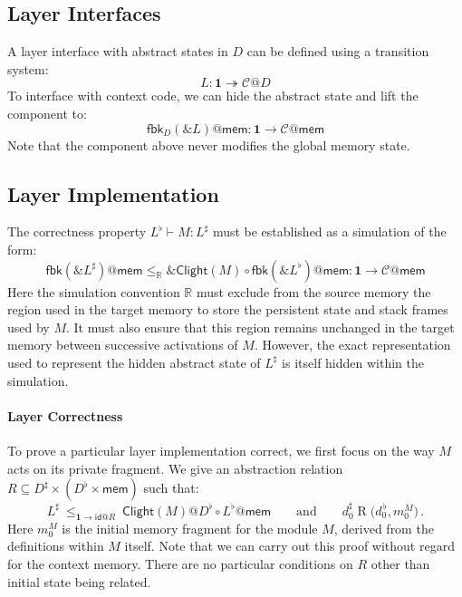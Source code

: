 \documentclass[acmsmall,screen,review,anonymous]{acmart}
\newcommand{\kw}[1]{\ensuremath{ \mathsf{#1} }}
\begin{document}
\subsection{Layer Interfaces} %

A layer interface with abstract states in $D$
can be defined using a transition system:
\[
  L : \mathbf{1} \twoheadrightarrow \mathcal{C}@D
\]
To interface with context code,
we can hide the abstract state and lift the component to:
\[
  \kw{fbk}_D(\&L)@\kw{mem} : \mathbf{1} \rightarrow \mathcal{C}@\kw{mem}
\]
Note that the component above never modifies the global memory state.


\subsection{Layer Implementation} %

The correctness property $L^\flat \vdash M : L^\sharp$
must be established as a simulation of the form:
\[
  \kw{fbk}(\&L^\sharp)@\kw{mem}
  \le_\mathbb{R}
  \&\kw{Clight}(M) \circ \kw{fbk}(\&L^\flat)@\kw{mem}
  :
  \mathbf{1} \rightarrow \mathcal{C}@\kw{mem}
\]
Here the simulation convention $\mathbb{R}$
must exclude from the source memory
the region used in the target memory
to store the persistent state and stack frames used by $M$.
It must also ensure that
this region remains unchanged in the target memory
between successive activations of $M$.
However,
the exact representation used
to represent the hidden abstract state of $L^\sharp$
is itself hidden within the simulation.

\paragraph{Layer Correctness}

To prove a particular layer implementation correct,
we first focus on the way $M$ acts on its private fragment.
We give an abstraction relation
$R \subseteq D^\sharp \times (D^\flat \times \kw{mem})$
such that:
\begin{equation}
  L^\sharp
  \:\le_{\mathbf{1} \rightarrow \kw{id}@R}\:
  \kw{Clight}(M)@D^\flat \circ L^\flat@\kw{mem}
  \qquad \text{and} \qquad
  d^\sharp_0 \mathrel{R} \big( d^{\,\flat}_0, m_0^M \big)
  \,.
  \label{eqn:lc}
\end{equation}
Here $m_0^M$ is the initial memory fragment for the module $M$,
derived from the definitions within $M$ itself.
Note that we can carry out this proof without regard for the context memory.
There are no particular conditions on $R$ other than
initial state being related.
\end{document}
